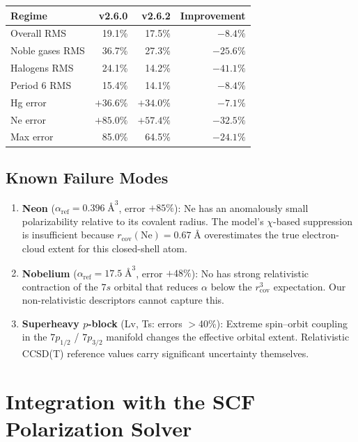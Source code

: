 \documentclass[11pt,letterpaper]{article}
\newcommand{\rcov}{r_{\mathrm{cov}}}
\newcommand{\Ang}{\text{\AA}}
\begin{document}
\begin{center}
\begin{tabular}{lrrr}
\toprule
\textbf{Regime} & \textbf{v2.6.0} & \textbf{v2.6.2} & \textbf{Improvement} \\
\midrule
Overall RMS           & 19.1\% & 17.5\% & $-8.4\%$ \\
Noble gases RMS       & 36.7\% & 27.3\% & $-25.6\%$ \\
Halogens RMS          & 24.1\% & 14.2\% & $-41.1\%$ \\
Period 6 RMS          & 15.4\% & 14.1\% & $-8.4\%$ \\
Hg error              & $+36.6\%$ & $+34.0\%$ & $-7.1\%$ \\
Ne error              & $+85.0\%$ & $+57.4\%$ & $-32.5\%$ \\
Max error             & 85.0\% & 64.5\% & $-24.1\%$ \\
\bottomrule
\end{tabular}
\end{center}

\subsection{Known Failure Modes}

\begin{enumerate}
\item \textbf{Neon} ($\alpha_{\mathrm{ref}} = 0.396\;\Ang^3$, error
  $+85\%$): Ne has an anomalously small polarizability relative to its
  covalent radius.  The model's $\chi$-based suppression is insufficient
  because $\rcov(\mathrm{Ne}) = 0.67\;\Ang$ overestimates the true
  electron-cloud extent for this closed-shell atom.

\item \textbf{Nobelium} ($\alpha_{\mathrm{ref}} = 17.5\;\Ang^3$, error
  $+48\%$): No has strong relativistic contraction of the $7s$ orbital
  that reduces $\alpha$ below the $\rcov^3$ expectation.  Our
  non-relativistic descriptors cannot capture this.

\item \textbf{Superheavy $p$-block} (Lv, Ts: errors $>$40\%):
  Extreme spin--orbit coupling in the $7p_{1/2}$ / $7p_{3/2}$ manifold
  changes the effective orbital extent.  Relativistic CCSD(T) reference
  values carry significant uncertainty themselves.
\end{enumerate}

\section{Integration with the SCF Polarization Solver}
\label{sec:scf}
\end{document}
